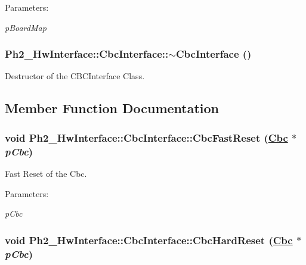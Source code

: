 \begin{Desc}
\item[Parameters:]
\begin{description}
\item[{\em p\-Board\-Map}]\end{description}
\end{Desc}
\hypertarget{class_ph2___hw_interface_1_1_cbc_interface_1f0ab7d7cf7783a0fe275e8e1d7e5a49}{
\subsubsection[$\sim$CbcInterface]{\setlength{\rightskip}{0pt plus 5cm}Ph2\_\-Hw\-Interface::Cbc\-Interface::$\sim$Cbc\-Interface ()}}
\label{class_ph2___hw_interface_1_1_cbc_interface_1f0ab7d7cf7783a0fe275e8e1d7e5a49}


Destructor of the CBCInterface Class. 



\subsection{Member Function Documentation}
\hypertarget{class_ph2___hw_interface_1_1_cbc_interface_e2166f5bd24481d88bdd015d1db08051}{
\subsubsection[CbcFastReset]{\setlength{\rightskip}{0pt plus 5cm}void Ph2\_\-Hw\-Interface::Cbc\-Interface::Cbc\-Fast\-Reset (\hyperlink{class_ph2___hw_description_1_1_cbc}{Cbc} $\ast$ {\em p\-Cbc})}}
\label{class_ph2___hw_interface_1_1_cbc_interface_e2166f5bd24481d88bdd015d1db08051}


Fast Reset of the Cbc. 

\begin{Desc}
\item[Parameters:]
\begin{description}
\item[{\em p\-Cbc}]\end{description}
\end{Desc}
\hypertarget{class_ph2___hw_interface_1_1_cbc_interface_0e9a7f5c0a444cb8ca14f3a90cd9e759}{
\subsubsection[CbcHardReset]{\setlength{\rightskip}{0pt plus 5cm}void Ph2\_\-Hw\-Interface::Cbc\-Interface::Cbc\-Hard\-Reset (\hyperlink{class_ph2___hw_description_1_1_cbc}{Cbc} $\ast$ {\em p\-Cbc})}}
\label{class_ph2___hw_interface_1_1_cbc_interface_0e9a7f5c0a444cb8ca14f3a90cd9e759}



